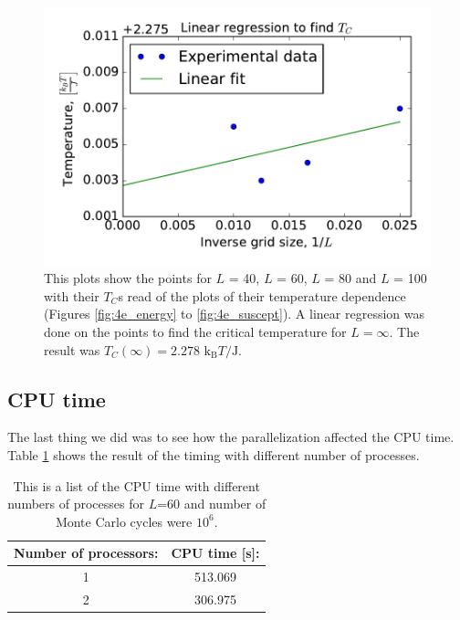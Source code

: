 \begin{figure}[H]
\includegraphics[width=\linewidth]{../results/4e/linfit}\caption{This plots show the points for $L$ = 40, $L$ = 60, $L$ = 80 and $L$ = 100 with their $T_C$s read of the plots of their temperature dependence (Figures \ref{fig:4e_energy} to \ref{fig:4e_suscept}). A linear regression was done on the points to find the critical temperature for $L = \infty$. The result was $T_C(\infty) = 2.278$ $\text{k}_\text{B}T/\text{J}$. }\label{fig:linfit}
\end{figure}

\subsection{CPU time}

The last thing we did was to see how the parallelization affected the CPU time. Table \ref{tab:CPU} shows the result of the timing with different number of processes.

\begin{table}\caption{This is a list of the CPU time with different numbers of processes for $L$=60 and number of Monte Carlo cycles were $10^6$.}\label{tab:CPU}
\begin{tabular}{cc}
Number of processors:& CPU time [s]: \\ \hline
 1 & 513.069\\
 2 & 306.975\\
\end{tabular}
\end{table}